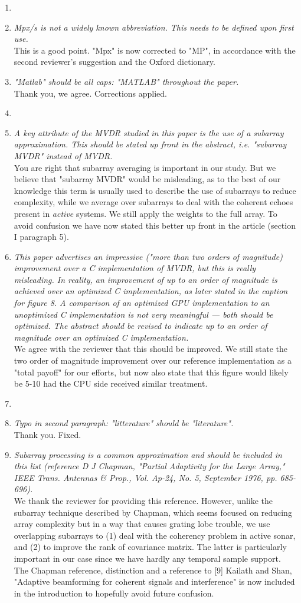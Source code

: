 \documentclass[11pt]{article} %
\newcommand\1{\vec 1}
\newcommand\q[1]{\textit{#1}}
\newcommand\qi[1]{\item\q{#1}}
\newcommand\hi[1]{\item[\textbf{#1}]}
\newcommand\ans[1]{#1}
\newcommand\ai[1]{\\[.5\baselineskip]\ans{#1}}
\begin{document}
\begin{enumerate}
\hi{General}
\qi{Mpx/s is not a widely known abbreviation. This needs to be defined upon first use.}
\ai{This is a good point. "Mpx" is now corrected to "MP", in accordance with the second reviewer's suggestion and the Oxford dictionary.}
\qi{"Matlab" should be all caps: "MATLAB" throughout the paper.}
\ai{Thank you, we agree. Corrections applied.}
%
\hi{Abstract}
\qi{A key attribute of the MVDR studied in this paper is the use of a subarray approximation. This should be stated up front in the abstract, i.e. "subarray MVDR" instead of MVDR.}
\ai{You are right that subarray averaging is important in our study. But we believe that "subarray MVDR" would be misleading, as to the best of our knowledge this term is usually used to describe the use of subarrays to reduce complexity, while we average over subarrays to deal with the coherent echoes present in \emph{active} systems. We still apply the weights to the full array. To avoid confusion we have now stated this better up front in the article (section I paragraph 5).}
%
\qi{This paper advertises an impressive ("more than two orders of magnitude) improvement over a C implementation of MVDR, but this is really misleading. In reality, an improvement of up to an order of magnitude is achieved over an optimized C implementation, as later stated in the caption for figure 8. A comparison of an optimized GPU implementation to an unoptimized C implementation is not very meaningful — both should be optimized. The abstract should be revised to indicate up to an order of magnitude over an optimized C implementation.}
\ai{We agree with the reviewer that this should be improved. We still state the two order of magnitude improvement over our reference implementation as a "total payoff" for our efforts, but now also state that this figure would likely be 5-10 had the CPU side received similar treatment.}
%
\hi{Section I}
\qi{Typo in second paragraph: "litterature" should be "literature".}
\ai{Thank you. Fixed.}
%
\qi{Subarray processing is a common approximation and should be included in this list (reference D J Chapman, "Partial Adaptivity for the Large Array," IEEE Trans. Antennas \& Prop., Vol. Ap-24, No. 5, September 1976, pp. 685-696).}
\ai{We thank the reviewer for providing this reference. However, unlike the subarray technique described by Chapman, which seems focused on reducing array complexity but in a way that causes grating lobe trouble, we use overlapping subarrays to (1) deal with the coherency problem in active sonar, and (2) to improve the rank of covariance matrix. The latter is particularly important in our case since we have hardly any temporal sample support. The Chapman reference,  distinction and a reference to [9] Kailath and Shan, "Adaptive beamforming for coherent signals and interference" is now included in the introduction to hopefully avoid future confusion.}

\end{enumerate}
\end{document}
